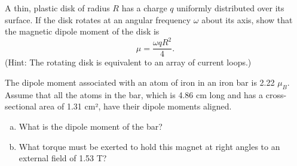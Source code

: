 \documentclass[12pt,letterpaper]{hmcpset}
\begin{document}
	\begin{problem}[35P1:]
		A thin, plastic disk of radius $R$ has a charge $q$ uniformly distributed over its surface.
		If the disk rotates at an angular frequency $\omega$ about its axis, show that the magnetic dipole moment of the disk is
		\[\mu = \frac{\omega qR^2}{4}.\]
		(Hint: The rotating disk is equivalent to an array of current loops.)
	\end{problem}
	\clearpage



	\begin{problem}[35E12:]
		The dipole moment associated with an atom of iron in an iron bar is 2.22 $\mu_B$.
		Assume that all the atoms in the bar, which is 4.86 cm long and has a cross-sectional area of 1.31 cm², have their dipole moments aligned.
		\begin{enumerate}[(a)]
			\item What is the dipole moment of the bar?
			\item What torque must be exerted to hold this magnet at right angles to an external field of 1.53 T?
		\end{enumerate}
	\end{problem}
	\clearpage
\end{document}

